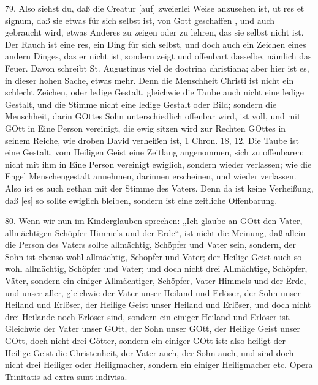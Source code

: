 79. Also siehst du, daß die Creatur [auf] zweierlei Weise anzusehen ist, ut res et signum, daß sie etwas für sich selbst ist, von Gott geschaffen
, und auch gebraucht wird, etwas Anderes zu zeigen oder zu lehren, das sie selbst nicht ist. Der Rauch ist eine res, ein Ding für sich selbst, und doch auch ein Zeichen eines andern Dinges, das er nicht ist, sondern zeigt und offenbart dasselbe, nämlich das Feuer. Davon schreibt St. Augustinus viel de doctrina christiana; aber hier ist es, in dieser hohen Sache, etwas mehr. Denn die Menschheit Christi ist nicht ein schlecht Zeichen, oder ledige Gestalt, gleichwie die Taube auch nicht eine ledige Gestalt, und die Stimme nicht eine ledige Gestalt oder Bild; sondern die Menschheit, darin GOttes Sohn unterschiedlich offenbar wird, ist voll, und mit GOtt in Eine Person vereinigt, die ewig sitzen wird zur Rechten GOttes in seinem Reiche, wie droben David verheißen ist, 1 Chron. 18, 12. Die Taube ist eine Gestalt, vom Heiligen Geist eine Zeitlang angenommen, sich zu offenbaren; nicht mit ihm in Eine Person vereinigt ewiglich, sondern wieder verlassen; wie die Engel Menschengestalt annehmen, darinnen erscheinen, und wieder verlassen. Also ist es auch gethan mit der Stimme des Vaters. Denn da ist keine Verheißung, daß [es] so sollte ewiglich bleiben, sondern ist eine zeitliche Offenbarung.

80. Wenn wir nun im Kinderglauben sprechen: „Ich glaube an GOtt den Vater, allmächtigen Schöpfer Himmels und der Erde“, ist nicht die Meinung, daß allein die Person des Vaters sollte allmächtig, Schöpfer und Vater sein, sondern, der Sohn ist ebenso wohl allmächtig, Schöpfer und Vater; der Heilige Geist auch so wohl allmächtig, Schöpfer und Vater; und doch nicht drei Allmächtige, Schöpfer, Väter, sondern ein einiger Allmächtiger, Schöpfer, Vater Himmels und der Erde, und unser aller, gleichwie der Vater unser Heiland und Erlöser, der Sohn unser Heiland und Erlöser, der Heilige Geist unser Heiland und Erlöser, und doch nicht drei Heilande noch Erlöser sind, sondern ein einiger Heiland und Erlöser ist. Gleichwie der Vater unser GOtt, der Sohn unser GOtt, der Heilige Geist unser GOtt, doch nicht drei Götter, sondern ein einiger GOtt ist: also heiligt der Heilige Geist die Christenheit, der Vater auch, der Sohn auch, und sind doch nicht drei Heiliger oder Heiligmacher, sondern ein einiger Heiligmacher etc. Opera Trinitatis ad extra sunt indivisa.

